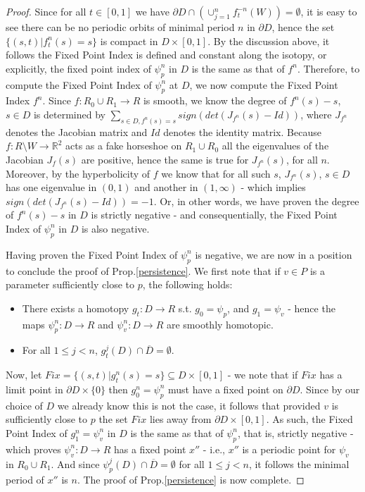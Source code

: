 \documentclass[10pt,reqno]{amsart}
\theoremstyle{plain}
\theoremstyle{assumption}
\theoremstyle{notation}
\theoremstyle{claim}
\theoremstyle{conj}
\theoremstyle{theorem}
\theoremstyle{proposition}
\theoremstyle{corollary}
\begin{document}
\begin{proof}
Since for all $t\in[0,1]$ we have $\partial D\cap (\cup_{j=1}^nf^{-n}_t(W))=\emptyset$, it is easy to see there can be no periodic orbits of minimal period $n$ in $\partial D$, hence the set $\{(s,t)|f^n_t(s)=s\}$ is compact in $D\times[0,1]$. By the discussion above, it follows the Fixed Point Index is defined and constant along the isotopy, or explicitly, the fixed point index of $\psi^n_p$ in $D$ is the same as that of $f^n$. Therefore, to compute the Fixed Point Index of $\psi^n_p$ at $D$, we now compute the Fixed Point Index  $f^n$. Since $f:R_0\cup R_1\to R$ is smooth, we know the degree of $f^n(s)-s$, $s\in D$ is determined by $\sum_{s\in D,f^n(s)=s} sign(det(J_{f^n}(s)-Id))$, where $J_{f^n}$ denotes the Jacobian matrix and $Id$ denotes the identity matrix. Because $f:R\setminus W\to\mathbb{R}^2$ acts as a fake horseshoe on $R_1\cup R_0$ all the eigenvalues of the Jacobian $J_f(s)$ are positive, hence the same is true for $J_{f^n}(s)$, for all $n$. Moreover, by the hyperbolicity of $f$ we know that for all such $s$, $J_{f^n}(s)$, $s\in D$ has one eigenvalue in $(0,1)$ and another in $(1,\infty)$ - which implies $sign(det(J_{f^n}(s)-Id))=-1$. Or, in other words, we have proven the degree of $f^n(s)-s$ in $D$ is strictly negative - and consequentially, the Fixed Point Index of $\psi^n_p$ in $D$ is also negative.

Having proven the Fixed Point Index of $\psi^n_p$ is negative, we are now in a position to conclude the proof of Prop.\ref{persistence}. We first note that if $v\in P$ is a parameter sufficiently close to $p$, the following holds:
\begin{itemize}
    \item There exists a homotopy $g_t:D\to{R}$ s.t. $g_0=\psi_p$, and $g_1=\psi_v$ - hence the maps $\psi^n_p:D\to R$ and $\psi_v^n:D\to R$ are smoothly homotopic.
    \item For all $1\leq j<n$, $g^j_t(D)\cap \overline{D}=\emptyset$.
\end{itemize}

Now, let $Fix=\{(s,t)|g^n_t(s)=s\}\subseteq D\times[0,1]$ - we note that if $Fix$ has a limit point in $\partial D\times\{0\}$ then $g^n_0=\psi^n_p$ must have a fixed point on $\partial D$. Since by our choice of $D$ we already know this is not the case, it follows that provided $v$ is sufficiently close to $p$ the set $Fix$ lies away from $\partial D\times[0,1]$. As such, the Fixed Point Index of $g^n_1=\psi^n_v$ in $D$ is the same as that of $\psi^n_p$, that is, strictly negative - which proves $\psi^n_v:D\to R$ has a fixed point $x''$ - i.e., $x''$ is a periodic point for $\psi_v$ in $R_0\cup R_1$. And since $\psi^j_p(D)\cap\overline{D}=\emptyset$ for all $1\leq j<n$, it follows the minimal period of $x''$ is $n$. The proof of Prop.\ref{persistence} is now complete.
\end{proof}
\end{document}
